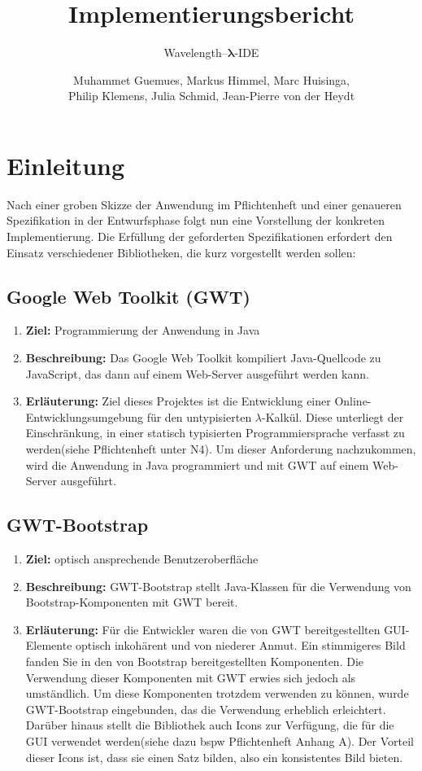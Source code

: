\documentclass[parskip=full,11pt,twoside]{scrartcl}
\title{Implementierungsbericht}
\subtitle{Wavelength--$\bm{\lambda}$-IDE}
\author{Muhammet Guemues, Markus Himmel, Marc Huisinga,\\Philip Klemens, Julia Schmid, Jean-Pierre von der Heydt}
\begin{document}
\maketitle
\newpage
\tableofcontents
\newpage

\section{Einleitung}
Nach einer groben Skizze der Anwendung im Pflichtenheft und einer genaueren Spezifikation in der Entwurfsphase folgt nun eine Vorstellung der konkreten Implementierung.
Die Erfüllung der geforderten Spezifikationen erfordert den Einsatz verschiedener Bibliotheken, die kurz vorgestellt werden sollen:

\subsection{Google Web Toolkit (GWT)}
\begin{enumerate}
\item[] \textbf{Ziel:} Programmierung der Anwendung in Java 
\item[] \textbf{Beschreibung:} Das Google Web Toolkit kompiliert Java-Quellcode zu JavaScript, das dann auf einem Web-Server ausgeführt werden kann.
\item[] \textbf{Erläuterung:} Ziel dieses Projektes ist die Entwicklung einer Online-Entwicklungsumgebung für den untypisierten $\lambda$-Kalkül.
Diese unterliegt der Einschränkung, in einer statisch typisierten Programmiersprache verfasst zu werden(siehe Pflichtenheft unter N4).
Um dieser Anforderung nachzukommen, wird die Anwendung in Java programmiert und mit GWT auf einem Web-Server ausgeführt.
\end{enumerate}

\subsection{GWT-Bootstrap}
\begin{enumerate}
\item[] \textbf{Ziel:} optisch ansprechende Benutzeroberfläche 
\item[] \textbf{Beschreibung:} GWT-Bootstrap stellt Java-Klassen für die Verwendung von Bootstrap-Komponenten mit GWT bereit.
\item[] \textbf{Erläuterung:} Für die Entwickler waren die von GWT bereitgestellten GUI-Elemente optisch inkohärent und von niederer Anmut.
Ein stimmigeres Bild fanden Sie in den von Bootstrap bereitgestellten Komponenten.
Die Verwendung dieser Komponenten mit GWT erwies sich jedoch als umständlich.
Um diese Komponenten trotzdem verwenden zu können, wurde GWT-Bootstrap eingebunden, das die Verwendung erheblich erleichtert.
Darüber hinaus stellt die Bibliothek auch Icons zur Verfügung, die für die GUI verwendet werden(siehe dazu bspw Pflichtenheft Anhang A).
Der Vorteil dieser Icons ist, dass sie einen Satz bilden, also ein konsistentes Bild bieten.
\end{enumerate}
\end{document}
